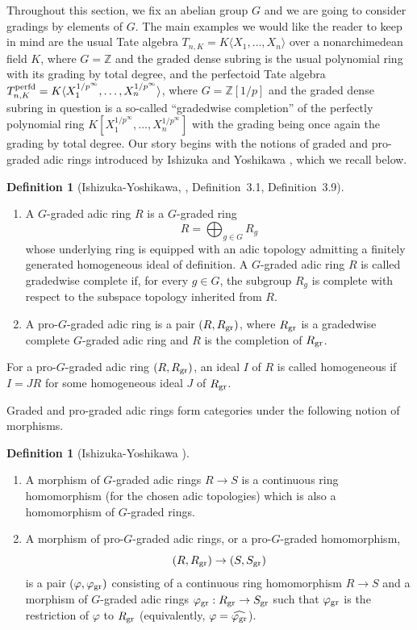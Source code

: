 \documentclass[12pt,twoside,a4paper]{article}
\theoremstyle{definition}
\newtheorem{mydef}[thm]{Definition}
\theoremstyle{remark}
\newcommand\gr{{\rm gr}}
\newcommand\perfd{{\rm perfd}}
\begin{document}
Throughout this section, we fix an abelian group $G$ and we are going to consider gradings by elements of $G$. The main examples we would like the reader to keep in mind are the usual Tate algebra $T_{n, K}=K\langle X_1,\dots, X_n\rangle$ over a nonarchimedean field $K$, where $G=\mathbb{Z}$ and the graded dense subring is the usual polynomial ring with its grading by total degree, and the perfectoid Tate algebra $T_{n, K}^{\perfd}=K\langle X_{1}^{1/p^{\infty}},\dots, X_{n}^{1/p^{\infty}}\rangle$, where $G=\mathbb{Z}[1/p]$ and the graded dense subring in question is a so-called ``gradedwise completion'' of the perfectly polynomial ring $K[X_{1}^{1/p^{\infty}},\dots, X_{n}^{1/p^{\infty}}]$ with the grading being once again the grading by total degree. Our story begins with the notions of graded and pro-graded adic rings introduced by Ishizuka and Yoshikawa \cite{Ishizuka-Yoshikawa25}, which we recall below. 
\begin{mydef}[Ishizuka-Yoshikawa, \cite{Ishizuka-Yoshikawa25}, Definition~3.1, Definition~3.9]\begin{enumerate}[(1)] \item A $G$-graded adic ring $R$ is a $G$-graded ring \begin{equation*}R=\bigoplus_{g\in G}R_{g}\end{equation*}whose underlying ring is equipped with an adic topology admitting a finitely generated homogeneous ideal of definition. A $G$-graded adic ring $R$ is called gradedwise complete if, for every $g\in G$, the subgroup $R_{g}$ is complete with respect to the subspace topology inherited from $R$. \item A pro-$G$-graded adic ring is a pair $(R, R_{\gr})$, where $R_{\gr}$ is a gradedwise complete $G$-graded adic ring and $R$ is the completion of $R_{\gr}$. \end{enumerate}For a pro-$G$-graded adic ring $(R, R_{\gr})$, an ideal $I$ of $R$ is called homogeneous if $I=JR$ for some homogeneous ideal $J$ of $R_{\gr}$.\end{mydef}
Graded and pro-graded adic rings form categories under the following notion of morphisms.
\begin{mydef}[Ishizuka-Yoshikawa \cite{Ishizuka-Yoshikawa25}]\begin{enumerate}[(1)]\item A morphism of $G$-graded adic rings $R\to S$ is a continuous ring homomorphism (for the chosen adic topologies) which is also a homomorphism of $G$-graded rings. \item A morphism of pro-$G$-graded adic rings, or a pro-$G$-graded homomorphism, \begin{equation*}(R, R_{\gr})\to (S, S_{\gr})\end{equation*}is a pair $(\varphi, \varphi_{\gr})$ consisting of a continuous ring homomorphism $R\to S$ and a morphism of $G$-graded adic rings $\varphi_{\gr}: R_{\gr}\to S_{\gr}$ such that $\varphi_{\gr}$ is the restriction of $\varphi$ to $R_{\gr}$ (equivalently, $\varphi=\widehat{\varphi_{\gr}}$). \end{enumerate}\end{mydef}
\end{document}
